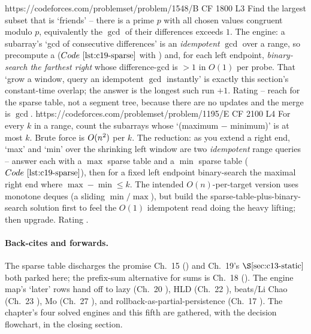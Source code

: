\begin{practiceset}
    {https://codeforces.com/problemset/problem/1548/B}
    {CF 1800 L3}
    {Find the largest subset that is `friends' -- there is a prime \(p\) with all chosen values congruent modulo \(p\), equivalently the \(\gcd\) of their differences exceeds \(1\). The engine: a subarray's `gcd of consecutive differences' is an \emph{idempotent} \(\gcd\) over a range, so precompute a  (\(\coderef{c19-sparse}\) with ) and, for each left endpoint, \emph{binary-search the farthest right} whose difference-gcd is \(>1\) in \(O(1)\) per probe. That `grow a window, query an idempotent \(\gcd\) instantly' is exactly this section's constant-time overlap; the answer is the longest such run \(+1\). Rating  -- reach for the sparse table, not a segment tree, because there are no updates and the merge is \(\gcd\).}
    {https://codeforces.com/problemset/problem/1195/E}
    {CF 2100 L4}
    {For every \(k\) in a range, count the subarrays whose `(maximum \(-\) minimum)' is at most \(k\). Brute force is \(O(n^2)\) per \(k\). The reduction: as you extend a right end, `max' and `min' over the shrinking left window are two \emph{idempotent} range queries -- answer each with a \(\max\) sparse table and a \(\min\) sparse table (\(\coderef{c19-sparse}\)), then for a fixed left endpoint binary-search the maximal right end where \(\max-\min\le k\). The intended \(O(n)\)-per-target version uses monotone deques (a sliding \(\min/\max\)), but build the sparse-table-plus-binary-search solution first to feel the \(O(1)\) idempotent read doing the heavy lifting; then upgrade. Rating .}
\end{practiceset}

\paragraph{Back-cites and forwards.}
The sparse table discharges the promise Ch.~15 () and Ch.~19's \(\secref{c13-static}\) both parked here; the prefix-sum alternative for sums is Ch.~18 (). The engine map's `later' rows hand off to lazy (Ch.~20 ), HLD (Ch.~22 ), beats/Li Chao (Ch.~23 ), Mo (Ch.~27 ), and rollback-as-partial-persistence (Ch.~17 ). The chapter's four solved engines and this fifth are gathered, with the decision flowchart, in the closing section.

